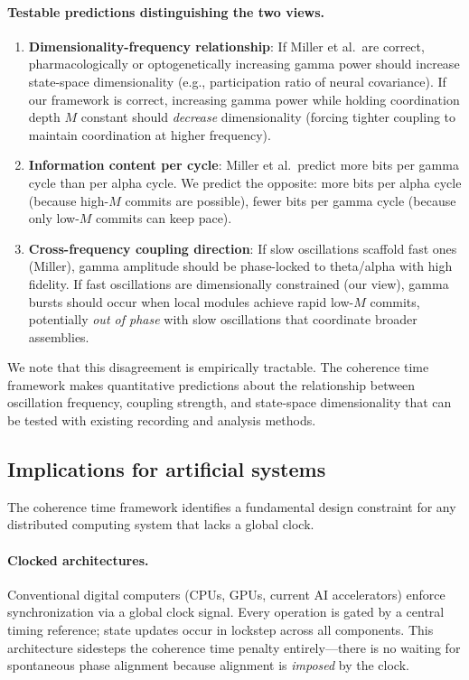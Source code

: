 \documentclass[12pt]{article}
\begin{document}
\paragraph{Testable predictions distinguishing the two views.}
\begin{enumerate}
\item \textbf{Dimensionality-frequency relationship}: If Miller et al.\ are correct, pharmacologically or optogenetically increasing gamma power should increase state-space dimensionality (e.g., participation ratio of neural covariance). If our framework is correct, increasing gamma power while holding coordination depth $M$ constant should \emph{decrease} dimensionality (forcing tighter coupling to maintain coordination at higher frequency).
\item \textbf{Information content per cycle}: Miller et al.\ predict more bits per gamma cycle than per alpha cycle. We predict the opposite: more bits per alpha cycle (because high-$M$ commits are possible), fewer bits per gamma cycle (because only low-$M$ commits can keep pace).
\item \textbf{Cross-frequency coupling direction}: If slow oscillations scaffold fast ones (Miller), gamma amplitude should be phase-locked to theta/alpha with high fidelity. If fast oscillations are dimensionally constrained (our view), gamma bursts should occur when local modules achieve rapid low-$M$ commits, potentially \emph{out of phase} with slow oscillations that coordinate broader assemblies.
\end{enumerate}

We note that this disagreement is empirically tractable. The coherence time framework makes quantitative predictions about the relationship between oscillation frequency, coupling strength, and state-space dimensionality that can be tested with existing recording and analysis methods.

\subsection{Implications for artificial systems}

The coherence time framework identifies a fundamental design constraint for any distributed computing system that lacks a global clock.

\paragraph{Clocked architectures.} Conventional digital computers (CPUs, GPUs, current AI accelerators) enforce synchronization via a global clock signal. Every operation is gated by a central timing reference; state updates occur in lockstep across all components. This architecture sidesteps the coherence time penalty entirely---there is no waiting for spontaneous phase alignment because alignment is \emph{imposed} by the clock.
\end{document}
